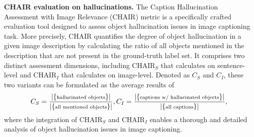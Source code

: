 \documentclass[10pt,twocolumn,letterpaper]{article}
\begin{document}
\noindent\textbf{CHAIR evaluation on hallucinations.}
\label{sec:chair_exp}
The Caption Hallucination Assessment with Image Relevance (CHAIR) \cite{rohrbach2018object} metric is a specifically crafted evaluation tool designed to assess object hallucination issues in image captioning task. 
More precisely, CHAIR quantifies the degree of object hallucination in a given image description by calculating the ratio of all objects mentioned in the description that are not present in the ground-truth label set.
It comprises two distinct assessment dimensions, including CHAIR$_S$ that calculates on sentence-level and CHAIR$_I$ that calculates on image-level. 
Denoted as $C_S$ and $C_I$, these two variants can be formulated as the average results of
\begin{equation}
    \scriptsize C_S = \frac{|\{\text{hallucinated objects}\}|}{|\{\text{all mentioned objects}\}|}, C_I = \frac{|\{\text{captions w/ hallucinated objects}\}|}{|\{\text{all captions}\}|},
\nonumber
\end{equation}
where the integration of CHAIR$_S$ and CHAIR$_I$ enables a thorough and detailed analysis of object hallucination issues in image captioning. 





\begin{table}[t]
    \footnotesize
    \centering
    \vspace{-0.5em}
    \caption{CHAIR hallucination evaluation results on four MLLM models (\textit{max new tokens} is 512). Denote CHAIR$_S$ as $C_S$ and CHAIR$_I$ as $C_I$. Smaller values corresponds to less hallucinations.}
    \label{tab:chair_eval_512}
\end{table}
\end{document}
